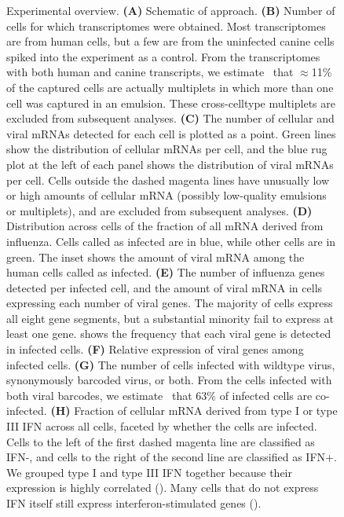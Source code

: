 \documentclass[9pt,lineno]{elife}
\begin{document}
\begin{figure}
\begin{fullwidth}
\caption{
Experimental overview.
{\bf (A)} Schematic of approach.
{\bf (B)} Number of cells for which transcriptomes were obtained.
Most transcriptomes are from human cells, but a few are from the uninfected canine cells spiked into the experiment as a control.
From the transcriptomes with both human and canine transcripts, we estimate~\citep{bloom2018estimating} that $\approx$11\% of the captured cells are actually multiplets in which more than one cell was captured in an emulsion. 
These cross-celltype multiplets are excluded from subsequent analyses.
{\bf (C)} The number of cellular and viral mRNAs detected for each cell is plotted as a point.
Green lines show the distribution of cellular mRNAs per cell, and the blue rug plot at the left of each panel shows the distribution of viral mRNAs per cell.
Cells outside the dashed magenta lines have unusually low or high amounts of cellular mRNA (possibly low-quality emulsions or multiplets), and are excluded from subsequent analyses.
{\bf (D)} Distribution across cells of the fraction of all mRNA derived from influenza.
Cells called as infected are in blue, while other cells are in green.
The inset shows the amount of viral mRNA among the human cells called as infected.
{\bf (E)} The number of influenza genes detected per infected cell, and the amount of viral mRNA in cells expressing each number of viral genes.
The majority of cells express all eight gene segments, but a substantial minority fail to express at least one gene.
 shows the frequency that each viral gene is detected in infected cells.
{\bf (F)} Relative expression of viral genes among infected cells.
{\bf (G)} The number of cells infected with wildtype virus, synonymously barcoded virus, or both.
From the cells infected with both viral barcodes, we estimate~\citep{bloom2018estimating} that 63\% of infected cells are co-infected.
{\bf (H)} Fraction of cellular mRNA derived from type I or type III IFN across all cells, faceted by whether the cells are infected.
Cells to the left of the first dashed magenta line are classified as IFN-, and cells to the right of the second line are classified as IFN+.
We grouped type I and type III IFN together because their expression is highly correlated ().
Many cells that do not express IFN itself still express interferon-stimulated genes ().
}
\label{fig:experiment}


\end{fullwidth}
\end{figure}
\end{document}

